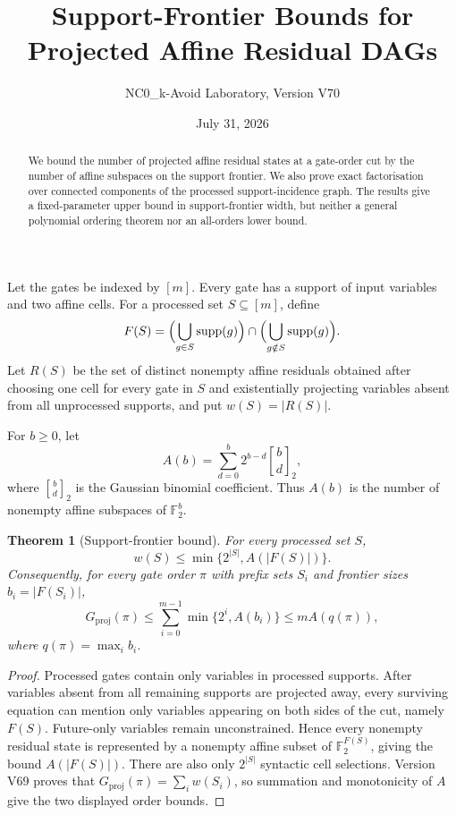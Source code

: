 \documentclass[11pt]{article}
\title{Support-Frontier Bounds for Projected Affine Residual DAGs}
\author{NC0\_k-Avoid Laboratory, Version V70}
\date{July 31, 2026}
\newtheorem{theorem}{Theorem}
\newcommand{\F}{\mathbb{F}}
\begin{document}
\maketitle

\begin{abstract}
We bound the number of projected affine residual states at a gate-order cut by the number of affine subspaces on the support frontier. We also prove exact factorisation over connected components of the processed support-incidence graph. The results give a fixed-parameter upper bound in support-frontier width, but neither a general polynomial ordering theorem nor an all-orders lower bound.
\end{abstract}

Let the gates be indexed by $[m]$. Every gate has a support of input variables and two affine cells. For a processed set $S\subseteq[m]$, define
\[
 F(S)=\Bigl(\bigcup_{g\in S}\operatorname{supp}(g)\Bigr)\cap
      \Bigl(\bigcup_{g\notin S}\operatorname{supp}(g)\Bigr).
\]
Let $R(S)$ be the set of distinct nonempty affine residuals obtained after choosing one cell for every gate in $S$ and existentially projecting variables absent from all unprocessed supports, and put $w(S)=|R(S)|$.

For $b\geq0$, let
\[
 A(b)=\sum_{d=0}^{b}2^{b-d}{b\brack d}_2,
\]
where ${b\brack d}_2$ is the Gaussian binomial coefficient. Thus $A(b)$ is the number of nonempty affine subspaces of $\F_2^b$.

\begin{theorem}[Support-frontier bound]
For every processed set $S$,
\[
 w(S)\leq \min\{2^{|S|},A(|F(S)|)\}.
\]
Consequently, for every gate order $\pi$ with prefix sets $S_i$ and frontier sizes $b_i=|F(S_i)|$,
\[
 G_{\mathrm{proj}}(\pi)
 \leq \sum_{i=0}^{m-1}\min\{2^i,A(b_i)\}
 \leq mA(q(\pi)),
\]
where $q(\pi)=\max_i b_i$.
\end{theorem}

\begin{proof}
Processed gates contain only variables in processed supports. After variables absent from all remaining supports are projected away, every surviving equation can mention only variables appearing on both sides of the cut, namely $F(S)$. Future-only variables remain unconstrained. Hence every nonempty residual state is represented by a nonempty affine subset of $\F_2^{F(S)}$, giving the bound $A(|F(S)|)$. There are also only $2^{|S|}$ syntactic cell selections. Version V69 proves that $G_{\mathrm{proj}}(\pi)=\sum_i w(S_i)$, so summation and monotonicity of $A$ give the two displayed order bounds.
\end{proof}
\end{document}

